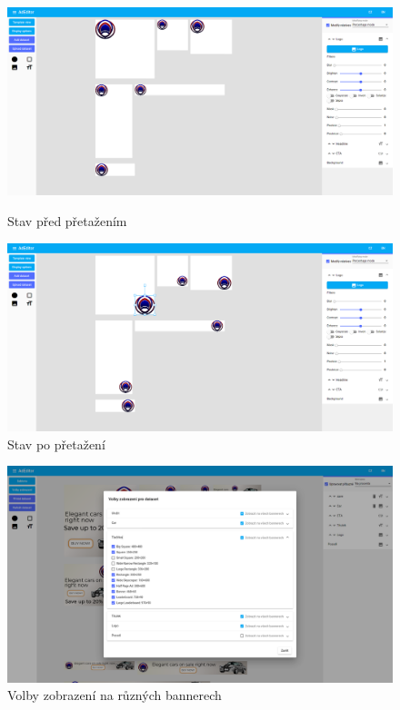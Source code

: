     \begin{figure}[ht]
        \centering
        \begin{minipage}{.45\linewidth}
            \centering
            \includegraphics[width=1\textwidth]{Figures/editor/before-move.png}
            \caption{Stav před přetažením}
            \label{fig:editor:before-move}
        \end{minipage}
        \begin{minipage}{.45\linewidth}
            \centering
            \includegraphics[width=1\textwidth]{Figures/editor/after-move.png}
            \caption{Stav po přetažení}
            \label{fig:editor:after-move}
        \end{minipage}
    \end{figure}

    \begin{figure}[h]
        \includegraphics[width=1.0\textwidth]{Figures/editor/volby-zobrazeni.png}
        \caption[Volby zobrazení prvků]{Volby zobrazení na různých bannerech}
        \label{fig:editor:options}
    \end{figure}



